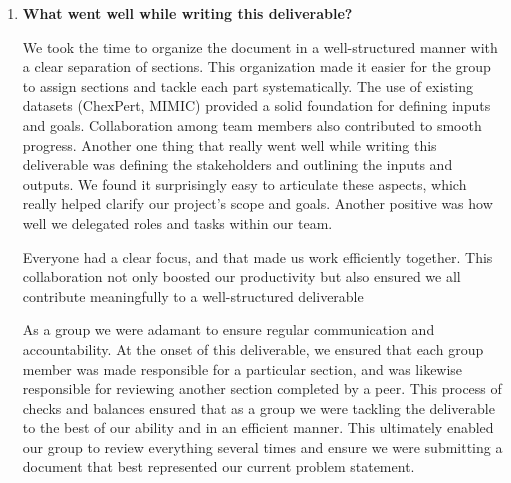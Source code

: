 \documentclass{article}
\begin{document}
\begin{enumerate}
    \item \textbf{What went well while writing this deliverable?} 
    \begin{itemize}
        \begin{item}
            We took the time to organize the document in a well-structured manner with a clear separation of sections. This organization made it easier for the group to assign sections and tackle each part systematically.  The use of existing datasets (ChexPert, MIMIC) provided a solid foundation for defining inputs and goals. Collaboration among team members also contributed to smooth progress. Another one thing that really went well while writing this deliverable was defining the stakeholders and outlining the inputs and outputs. We found it surprisingly easy to articulate these aspects, which really helped clarify our project’s scope and goals. Another positive was how well we delegated roles and tasks within our team. 
        \end{item}
        \begin{item}
            Everyone had a clear focus, and that made us work efficiently together. This collaboration not only boosted our productivity but also ensured we all contribute meaningfully to a well-structured deliverable
        \end{item}
        \begin{item}
            As a group we were adamant to ensure regular communication and accountability. At the onset of this deliverable, we ensured that each group member was made responsible for a particular section, and was likewise responsible for reviewing another section completed by a peer. This process of checks and balances ensured that as a group we were tackling the deliverable to the best of our ability and in an efficient manner. This ultimately enabled our group to review everything several times and ensure we were submitting a document that best represented our current problem statement.
        \end{item}
    \end{itemize}


\end{enumerate}
\end{document}
